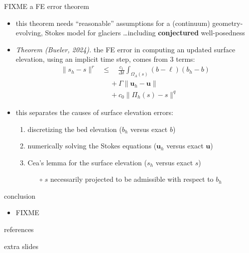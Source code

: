 \documentclass[10pt,dvipsnames]{beamer}
\newcommand{\bu}{\mathbf{u}}
\begin{document}
\begin{frame}{FIXME a FE error theorem}

\begin{itemize}
\item this theorem needs ``reasonable'' assumptions for a (continuum) geometry-evolving, Stokes model for glaciers \dots including \textbf{conjectured} well-posedness
\item \emph{Theorem (Bueler, 2024).}  the FE error in computing an updated surface elevation, using an implicit time step, comes from 3 terms:
\begin{align*}
\|s_h-s\|^r &\le \quad \frac{c_1}{\Delta t} \int_{\Omega_A(s)} (b - \ell) (b_h - b) \\
   &\quad\, + \Gamma \big\|\bu_h - \bu\big\| \\
   &\quad\, + c_0 \|\Pi_h(s) - s\|^q
\end{align*}
\item this separates the causes of surface elevation errors:
    \begin{enumerate}
    \item discretizing the bed elevation ($b_h$ versus exact $b$)
    \item numerically solving the Stokes equations ($\bu_h$ versus exact $\bu$)
    \item Cea's lemma for the surface elevation ($s_h$ versus exact $s$) \strut
        \begin{itemize}
        \item[$\circ$] $s$ necessarily projected to be admissible with respect to $b_h$
        \end{itemize}
    \end{enumerate}
\end{itemize}
\end{frame}


\begin{frame}{conclusion}

\begin{itemize}
\item FIXME
\end{itemize}
\end{frame}


\begin{frame}{references}

{\footnotesize }
\end{frame}


\begin{frame}[standout]

extra slides
\end{frame}
\end{document}
